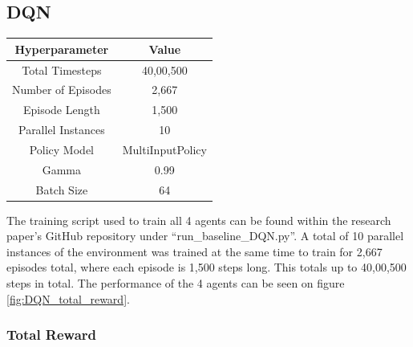\subsection{DQN}

\begin{center}
\begin{tabular}{ |c|c| } 
 \hline
 Hyperparameter & Value \\ 
 \hline
 Total Timesteps & 40,00,500 \\
 Number of Episodes &  2,667 \\
 Episode Length & 1,500 \\ 
 Parallel Instances & 10 \\
 Policy Model & MultiInputPolicy \\
 Gamma & 0.99 \\  
 Batch Size & 64 \\
 \hline
\end{tabular}
\end{center}

The training script used to train all 4 agents can be found within the research paper's GitHub repository under ``run\_baseline\_DQN.py''. A total of 10 parallel instances of the environment was trained at the same time to train for 2,667 episodes total, where each episode is 1,500 steps long. This totals up to 40,00,500 steps in total. The performance of the 4 agents can be seen on figure \ref{fig:DQN_total_reward}. 


\subsubsection{Total Reward}

